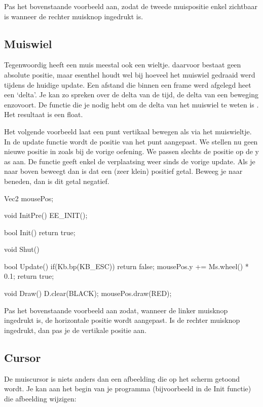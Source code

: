 \begin{exercise}
Pas het bovenstaande voorbeeld aan, zodat de tweede muispositie enkel zichtbaar is wanneer de rechter muisknop ingedrukt is.
\end{exercise} 



\subsection{Muiswiel}
Tegenwoordig heeft een muis meestal ook een wieltje. daarvoor bestaat geen absolute positie, maar esenthel houdt wel bij hoeveel het muiswiel gedraaid werd tijdens de huidige update. Een afstand die binnen een frame werd afgelegd heet een `delta'. Je kan zo spreken over de delta van de tijd, de delta van een beweging enzovoort. De functie die je nodig hebt om de delta van het muiswiel te weten is . Het resultaat is een float.

Het volgende voorbeeld laat een punt vertikaal bewegen als via het muiswieltje. In de update functie wordt de positie van het punt aangepast. We stellen nu geen nieuwe positie in zoals bij de vorige oefening. We passen slechts de positie op de y as aan. De functie  geeft enkel de verplaatsing weer sinds de vorige update. Als je naar boven beweegt dan is dat een (zeer klein) positief getal. Beweeg je naar beneden, dan is dit getal negatief.

\begin{code}
Vec2 mousePos;

void InitPre()
{
   EE_INIT();
}

bool Init()
{   
   return true;
}

void Shut() {}

bool Update()
{
   if(Kb.bp(KB_ESC)) return false;  
   mousePos.y += Ms.wheel() * 0.1;  
   return true;
}

void Draw()
{
   D.clear(BLACK);
   mousePos.draw(RED);
}
\end{code}

\begin{exercise}
Pas het bovenstaande voorbeeld aan zodat, wanneer de linker muisknop ingedrukt is, de horizontale positie wordt aangepast. Is de rechter muisknop ingedrukt, dan pas je de vertikale positie aan.
\end{exercise} 

\subsection{Cursor}
De muiscursor is niets anders dan een afbeelding die op het scherm getoond wordt. Je kan aan het begin van je programma (bijvoorbeeld in de Init functie) die afbeelding wijzigen:

